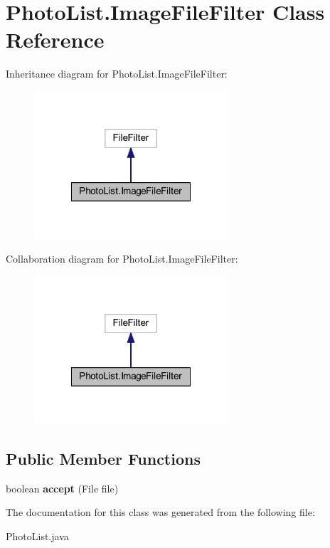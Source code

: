 \hypertarget{class_photo_list_1_1_image_file_filter}{\section{Photo\-List.\-Image\-File\-Filter Class Reference}
\label{class_photo_list_1_1_image_file_filter}
}


Inheritance diagram for Photo\-List.\-Image\-File\-Filter\-:
\nopagebreak
\begin{figure}[H]
\begin{center}
\leavevmode
\includegraphics[width=204pt]{class_photo_list_1_1_image_file_filter__inherit__graph}
\end{center}
\end{figure}


Collaboration diagram for Photo\-List.\-Image\-File\-Filter\-:
\nopagebreak
\begin{figure}[H]
\begin{center}
\leavevmode
\includegraphics[width=204pt]{class_photo_list_1_1_image_file_filter__coll__graph}
\end{center}
\end{figure}
\subsection*{Public Member Functions}
\begin{DoxyCompactItemize}
\item 
\hypertarget{class_photo_list_1_1_image_file_filter_a3e44844354fe08b8ae7d2e2a35c695c3}{boolean {\bfseries accept} (File file)}\label{class_photo_list_1_1_image_file_filter_a3e44844354fe08b8ae7d2e2a35c695c3}

\end{DoxyCompactItemize}


The documentation for this class was generated from the following file\-:\begin{DoxyCompactItemize}
\item 
Photo\-List.\-java\end{DoxyCompactItemize}
